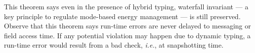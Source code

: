 \documentclass[onecolumn,nocopyrightspace]{sigplanconf}
\theoremstyle{lessintrusive}
\theoremstyle{plain}
\theoremstyle{custom}
\theoremstyle{subcase-custom}
\begin{document}
This theorem says even in the presence of hybrid typing, waterfall invariant --- a key principle to regulate mode-based energy management --- is still preserved. Observe that this theorem says run-time errors are never delayed to messaging or field access time. If any potential violation may happen due to dynamic typing, a run-time error would result from a bad check, \emph{i.e.}, at snapshotting time.
\end{document}
